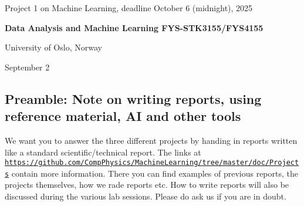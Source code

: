 \documentclass[%
oneside,                 %
final,                   %
10pt]{article}
\begin{document}

\newcommand{\exercisesection}[1]{\subsection*{#1}}






\thispagestyle{empty}

\begin{center}
{\LARGE\bf
\begin{spacing}{1.25}
Project 1 on Machine Learning, deadline October 6 (midnight), 2025
\end{spacing}
}
\end{center}


\begin{center}
{\bf Data Analysis and Machine Learning FYS-STK3155/FYS4155}
\end{center}

    \begin{center}
\centerline{{\small University of Oslo, Norway}}
\end{center}
    

\begin{center}
September 2
\end{center}

\vspace{1cm}


\subsection{Preamble: Note on writing reports, using reference material, AI and other tools}

We want you to answer the three different projects by handing in
reports written like a standard scientific/technical report.  The
links at
\href{{https://github.com/CompPhysics/MachineLearning/tree/master/doc/Projects}}{\nolinkurl{https://github.com/CompPhysics/MachineLearning/tree/master/doc/Projects}}
contain more information. There you can find examples of previous
reports, the projects themselves, how we rade reports etc. How to
write reports will also be discussed during the various lab
sessions. Please do ask us if you are in doubt.
\end{document}
